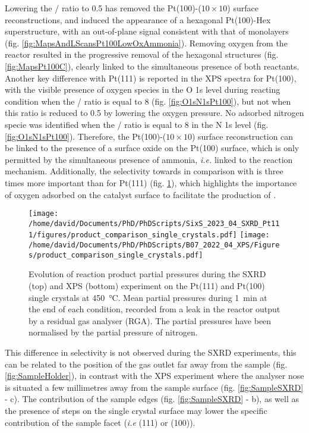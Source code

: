Lowering the / ratio to \num{0.5} has removed the Pt(100)-($10\times10$) surface reconstructions, and induced the appearance of a hexagonal Pt(100)-Hex superstructure, with an out-of-plane signal consistent with that of monolayers (fig. \ref{fig:MapsAndLScansPt100LowOxAmmonia}).
Removing oxygen from the reactor resulted in the progressive removal of the hexagonal structures (fig. \ref{fig:MapsPt100C}), clearly linked to the simultaneous presence of both reactants.
Another key difference with Pt(111) is reported in the XPS spectra for Pt(100), with the visible presence of oxygen species in the O 1s level during reacting condition when the / ratio is equal to \num{8} (fig. \ref{fig:O1sN1sPt100}), but not when this ratio is reduced to \num{0.5} by lowering the oxygen pressure.
No adsorbed nitrogen specie was identified when the / ratio is equal to \num{8} in the N 1s level  (fig. \ref{fig:O1sN1sPt100}).
Therefore, the Pt(100)-($10\times10$) surface reconstruction can be linked to the presence of a surface oxide on the Pt(100) surface, which is only permitted by the simultaneous presence of ammonia, \textit{i.e.} linked to the reaction mechanism.
Additionally, the selectivity towards  in comparison with  is three times more important than for Pt(111) (fig. \ref{fig:RGA450Pt111AndPt100}), which highlights the importance of oxygen adsorbed on the catalyst surface to facilitate the production of .

\begin{figure}[!htb]
    \centering
    \texttt{[image: /home/david/Documents/PhD/PhDScripts/SixS\_2023\_04\_SXRD\_Pt111/figures/product\_comparison\_single\_crystals.pdf]}
    \texttt{[image: /home/david/Documents/PhD/PhDScripts/B07\_2022\_04\_XPS/Figures/product\_comparison\_single\_crystals.pdf]}
    \caption{
        Evolution of reaction product partial pressures during the SXRD (top) and XPS (bottom) experiment on the Pt(111) and Pt(100) single crystals at \qty{450}{\degreeCelsius}.
        Mean partial pressures during \qty{1}{\minute} at the end of each condition, recorded from a leak in the reactor output by a residual gas analyser (RGA).
        The partial pressures have been normalised by the partial pressure of nitrogen.
    }
    \label{fig:RGA450Pt111AndPt100}
\end{figure}

This difference in selectivity is not observed during the SXRD experiments, this can be related to the position of the gas outlet far away from the sample (fig. \ref{fig:SampleHolder}), in contrast with the XPS experiment where the analyser nose is situated a few millimetres away from the sample surface (fig. \ref{fig:SampleSXRD} - c).
The contribution of the sample edges (fig. \ref{fig:SampleSXRD} - b), as well as the presence of steps on the single crystal surface may lower the specific contribution of the sample facet (\textit{i.e} (111) or (100)).

